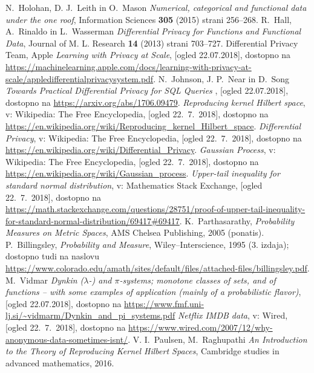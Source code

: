 \documentclass[12pt,a4paper]{amsart}
\theoremstyle{definition} %
\theoremstyle{plain} %
\begin{document}
\begin{thebibliography}{99}

N.~Holohan, D. J.~Leith in O.~Mason \emph{Numerical, categorical and functional data under the one roof}, Information Sciences \textbf{305} (2015) strani 256--268.
R.~Hall, A.~Rinaldo in L.~Wasserman \emph{Differential Privacy for Functions and Functional Data}, Journal of M. L. Research \textbf{14} (2013) strani 703--727.
Differential Privacy Team, Apple \emph{Learning with Privacy at Scale}, [ogled 22.07.2018], dostopno na \url{https://machinelearning.apple.com/docs/learning-with-privacy-at-scale/appledifferentialprivacysystem.pdf}.
N.~Johnson, J. P.~Near in D.~Song \emph{Towards Practical Differential Privacy for SQL Queries
}, [ogled 22.07.2018], dostopno na \url{https://arxiv.org/abs/1706.09479}.
\emph{Reproducing kernel Hilbert space}, v: Wikipedia: The Free Encyclopedia, [ogled 22.~7.~2018], dostopno na \url{https://en.wikipedia.org/wiki/Reproducing_kernel_Hilbert_space}.
\emph{Differential Privacy}, v: Wikipedia: The Free Encyclopedia, [ogled 22.~7.~2018], dostopno na \url{https://en.wikipedia.org/wiki/Differential_Privacy}.
\emph{Gaussian Process}, v: Wikipedia: The Free Encyclopedia, [ogled 22.~7.~2018], dostopno na \url{https://en.wikipedia.org/wiki/Gaussian_process}.
\emph{Upper-tail inequality for standard normal distribution}, v: Mathematics Stack Exchange, [ogled 22.~7.~2018], dostopno na \url{https://math.stackexchange.com/questions/28751/proof-of-upper-tail-inequality-for-standard-normal-distribution/69417#69417}.
K.~Parthasarathy, \emph{Probability Measures on Metric Spaces}, AMS Chelsea Publishing, 2005 (ponatis).
P.~Billingsley, \emph{Probability and Measure}, Wiley--Interscience, 1995 (3. izdaja); dostopno tudi na naslovu \url{https://www.colorado.edu/amath/sites/default/files/attached-files/billingsley.pdf}.
M.~Vidmar \emph{Dynkin ($\lambda$-) and $\pi$-systems; monotone classes of sets, and of
functions – with some examples of application (mainly of a
probabilistic flavor)}, [ogled 22.07.2018], dostopno na \url{https://www.fmf.uni-lj.si/~vidmarm/Dynkin_and_pi_systems.pdf} 
\emph{Netflix IMDB data}, v: Wired, [ogled 22.~7.~2018], dostopno na \url{https://www.wired.com/2007/12/why-anonymous-data-sometimes-isnt/}.
V. I.~Paulsen, M.~Raghupathi \emph{An Introduction to the Theory of Reproducing Kernel Hilbert Spaces}, Cambridge studies in advanced mathematics, 2016.





\end{thebibliography}
\end{document}
